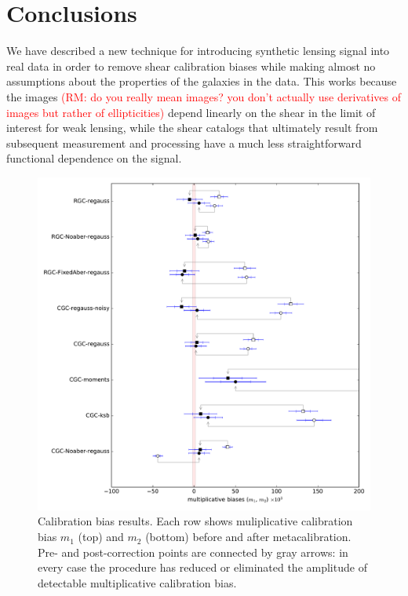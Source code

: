 \documentclass[iop]{emulateapj}
\newcommand\rmcomment[1]{\textcolor{red}{(RM: #1)}}
\begin{document}
\section{Conclusions}
We have described a new technique for introducing synthetic lensing
signal into real data in order to 
remove shear calibration biases while making almost no assumptions
about the properties of the galaxies in the data. This works because
the images \rmcomment{do you really mean images?  you don't actually use derivatives of images but
  rather of ellipticities} depend linearly on the shear in the limit of interest for
weak lensing, while the shear catalogs that ultimately result from
subsequent measurement and processing have a much less straightforward
functional dependence on the signal.

\begin{figure}[t]
\begin{center}
\includegraphics[width=0.8\linewidth]{./Plots/m_results_linear.pdf}
\end{center}
\caption{Calibration bias results. Each row shows muliplicative
  calibration bias $m_1$ (top) and $m_2$ (bottom) before and after
  metacalibration. Pre- and post-correction points are connected by
  gray arrows: in every case the procedure has reduced or eliminated
  the amplitude of detectable multiplicative calibration bias.}
\end{figure}
\end{document}
